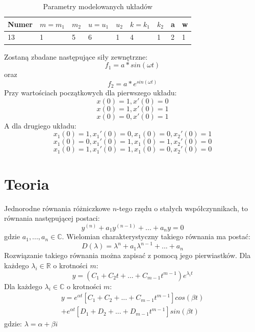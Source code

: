 \documentclass[12pt]{article}
\begin{document}
\begin{table}[H]
\begin{tabular}{lllllllll}
\hline
\textbf{Numer} & \textbf{$m=m_1$} & \textbf{$m_2$} & \textbf{$u=u_1$} & \textbf{$u_2$} & \textbf{$k=k_1$} & \textbf{$k_2$} & \textbf{a} & \textbf{w} \\ \hline
13             & 1             & 5           & 6               & 1             & 4               & 1             & 2          & 1          \\ \hline
\end{tabular}
\caption{Parametry modelowanych układów}
\end{table}

Zostaną zbadane następujące siły zewnętrzne:
$$f_1 = a*sin(\omega t) $$ oraz
$$f_2 = a*e^{sin(\omega t)} $$
Przy wartościach początkowych dla pierwszego układu:
$$x(0) = 1, x'(0) = 0$$
$$x(0) = 1, x'(0) = 1$$
$$x(0) = 0, x'(0) = 1$$
A dla drugiego układu:
$$x_1(0)=1, x_1'(0)=0, x_1(0)=0, x_2'(0)=1 $$
$$x_1(0)=0, x_1'(0)=1, x_1(0)=1, x_2'(0)=0 $$
$$x_1(0)=1, x_1'(0)=1, x_1(0)=0, x_2'(0)=0 $$

\section{Teoria}
Jednorodne równania różniczkowe $n$-tego rzędu o stałych współczynnikach, to równania
następującej postaci:
\begin{equation}
y^{(n)} + a_1 y^{(n-1)} + ... + a_n y = 0
\end{equation}
gdzie $a_1, ..., a_n \in \mathbb{C} $. Wielomian charakterystyczny takiego równania ma postać:
\begin{equation}
D(\lambda) = \lambda^n + a_1 \lambda^{n-1} + ... + a_n
\end{equation}
Rozwiązanie takiego równania można zapisać z pomocą jego pierwiastków.
Dla każdego $\lambda_i \in \mathbb{R}$ o krotności $m$:
\begin{equation}
y = (C_1 + C_2 t + ... + C_{m-1} t ^{m-1}) e^{\lambda_i t}
\end{equation}
Dla każdego $\lambda_i \in \mathbb{C}$ o krotności $m$:
\begin{equation}
\begin{split}
y = e^{\alpha t} \left[ C_1 + C_2 + ... + C_{m-1} t^{m-1} \right] cos(\beta t)  \\
    + e^{\alpha t} \left[ D_1 + D_2 + ... + D_{m-1} t^{m-1} \right] sin(\beta t)
\end{split}
\end{equation}
gdzie: $\lambda = \alpha + \beta i$
\end{document}
